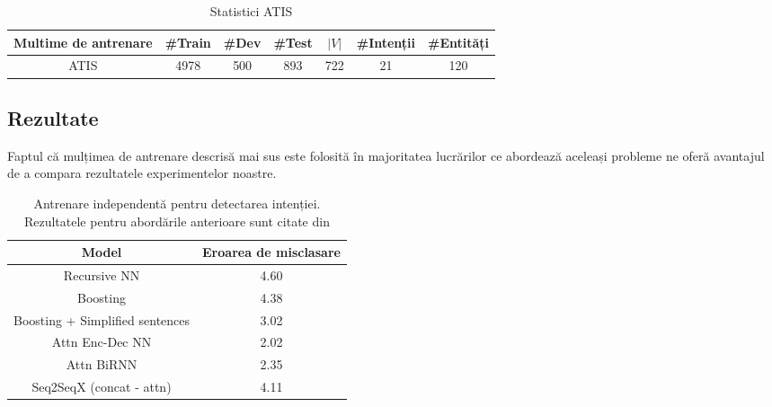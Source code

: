 \begin{table}
	\centering
	\caption{Statistici ATIS}
	\label{atis_stats}
	\begin{adjustbox}{max width=\textwidth}
		\begin{tabular}{ |c|c|c|c|c|c|c| } 
			\hline
			\textbf{Multime de antrenare} & \#Train & \#Dev & \#Test & $|V|$ & \#Intenții & \#Entități \\ 
			\hline
			ATIS & 4978 & 500 & 893 & 722 & 21 & 120 \\
			\hline
		\end{tabular}
	\end{adjustbox}
\end{table}


\subsection{Rezultate}
Faptul că mulțimea de antrenare descrisă mai sus este folosită în majoritatea lucrărilor ce abordează aceleași probleme ne oferă avantajul de a compara rezultatele experimentelor noastre.

\begin{table}[htp]
	\small
	\centering
	\begin{tabular}{ c c }
		\hline
		\textbf{Model} 		 & \textbf{Eroarea de misclasare}\\
		\hline
		Recursive NN \cite{recursive-nn-intent} & 4.60 \\
		Boosting \cite{boosting-intent} & 4.38 \\
		Boosting + Simplified sentences \cite{boostingplus-intent} & 3.02 \\
		Attn Enc-Dec NN \cite{att_joint_bing} & 2.02 \\
		Attn BiRNN \cite{att_joint_bing} & 2.35 \\
		\hline
		Seq2SeqX (concat - attn) & 4.11 \\
		\hline
	\end{tabular}
	\caption{Antrenare independentă pentru detectarea intenției. Rezultatele pentru abordările anterioare sunt citate din \cite{att_joint_bing}}
	\label{rezultate1}
\end{table}

